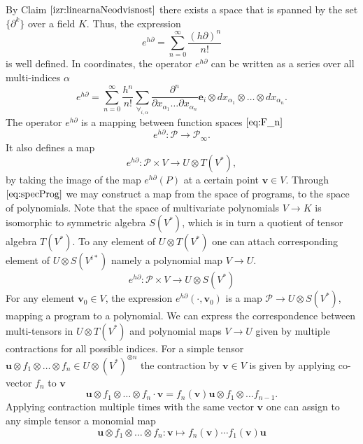 \documentclass{article}
\newcommand{\e}{\mathbf{e}}
\newcommand{\uu}{\mathbf{u}}
\newcommand{\vv}{\mathbf{v}}
\newcommand{\dP}{\mathcal{P}}
\newcommand{\D}{\partial}
\begin{document}
 By Claim $\ref{izr:linearnaNeodvisnost}$  there exists a space that is spanned by the set $\{\D^k\}$ over a field $K$. Thus, the expression
 \begin{equation}
 	e^{h\D}=\sum\limits_{n=0}^{\infty}\frac{(h\D)^n}{n!}
 \end{equation}
 is well defined. In coordinates, the operator $e^{h\D}$ can be written as a
 series over all multi-indices $\alpha$
 \begin{equation}\label{eq:e^d}
 	e^{h\D}=\sum\limits_{n=0}^{\infty}\frac{h^n}{n!}\sum_{\forall_{i,\alpha}}\frac{\partial^n}{\partial
 		    x_{\alpha_1}\ldots \partial x_{\alpha_n}}\e_i\otimes
 		  dx_{\alpha_1}\otimes\ldots \otimes dx_{\alpha_n}.
 \end{equation}
The operator $e^{h\D}$ is a mapping between function spaces $\eqref{eq:F_n}$
 \begin{equation}
 	e^{h\D}:\dP\to\dP_\infty.
 \end{equation}
 It also defines a map
  \begin{equation}\label{eq:specProg}
  	e^{h\D}:\dP\times V\to U\otimes T(V^*),
  \end{equation}
by taking the image of the map $e^{h\D}(P)$ at a certain point $\vv\in V$.  
Through $\eqref{eq:specProg}$ we may construct a map from the space of programs,
to the space of polynomials. Note that the space of multivariate polynomials
$V\to K$ is isomorphic to symmetric algebra $S(V^*)$, which is in turn a
quotient of tensor algebra $T(V^*)$. To any element of
 $U\otimes T(V^*)$ one can attach corresponding element of $U\otimes S(V^{i*})$
 namely a polynomial map  $V\to U$.
 \begin{equation}\label{eq:pToPol}
 	e^{h\D}: \dP\times V\to U\otimes S(V^*)
 \end{equation}
 For any element $\vv_0\in V$, the expression $e^{h\D}(\cdot,\vv_0)$ is a map $\dP\to
 U\otimes S(V^*)$, mapping a program to a polynomial. We can express the
 correspondence between multi-tensors in $U\otimes T(V^*)$ and polynomial maps
 $V\to U$ given by multiple contractions for all possible indices. For a simple tensor $\uu\otimes
 f_1\otimes\ldots\otimes f_n\in U\otimes(V^*)^{\otimes n}$ the contraction by
 $\vv\in V$ is given by applying co-vector $f_n$ to $\vv$ 
 \begin{equation}
   \label{eq:contraction}
 \uu\otimes f_1\otimes\ldots\otimes f_n\cdot \vv = f_n(\vv) \uu\otimes f_1\otimes\ldots f_{n-1}.
 \end{equation}
Applying contraction multiple times with the same vector $\vv$ one can assign to
any simple tensor a monomial map 
 \begin{equation}
   \label{eq:tensor->poly}
 \uu\otimes f_1\otimes\ldots\otimes f_n: \vv \mapsto f_n(\vv)\cdots f_1(\vv) \uu
 \end{equation}
\end{document}
